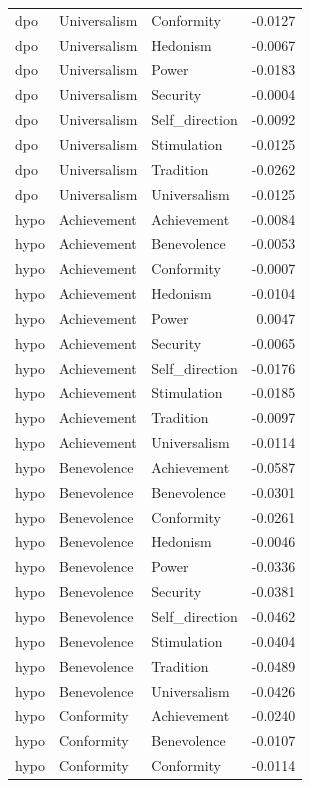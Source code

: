 \begin{tabular}{lllr}
dpo & Universalism & Conformity & -0.0127 \\
dpo & Universalism & Hedonism & -0.0067 \\
dpo & Universalism & Power & -0.0183 \\
dpo & Universalism & Security & -0.0004 \\
dpo & Universalism & Self\_direction & -0.0092 \\
dpo & Universalism & Stimulation & -0.0125 \\
dpo & Universalism & Tradition & -0.0262 \\
dpo & Universalism & Universalism & -0.0125 \\
hypo & Achievement & Achievement & -0.0084 \\
hypo & Achievement & Benevolence & -0.0053 \\
hypo & Achievement & Conformity & -0.0007 \\
hypo & Achievement & Hedonism & -0.0104 \\
hypo & Achievement & Power & 0.0047 \\
hypo & Achievement & Security & -0.0065 \\
hypo & Achievement & Self\_direction & -0.0176 \\
hypo & Achievement & Stimulation & -0.0185 \\
hypo & Achievement & Tradition & -0.0097 \\
hypo & Achievement & Universalism & -0.0114 \\
hypo & Benevolence & Achievement & -0.0587 \\
hypo & Benevolence & Benevolence & -0.0301 \\
hypo & Benevolence & Conformity & -0.0261 \\
hypo & Benevolence & Hedonism & -0.0046 \\
hypo & Benevolence & Power & -0.0336 \\
hypo & Benevolence & Security & -0.0381 \\
hypo & Benevolence & Self\_direction & -0.0462 \\
hypo & Benevolence & Stimulation & -0.0404 \\
hypo & Benevolence & Tradition & -0.0489 \\
hypo & Benevolence & Universalism & -0.0426 \\
hypo & Conformity & Achievement & -0.0240 \\
hypo & Conformity & Benevolence & -0.0107 \\
hypo & Conformity & Conformity & -0.0114 \\

\end{tabular}
